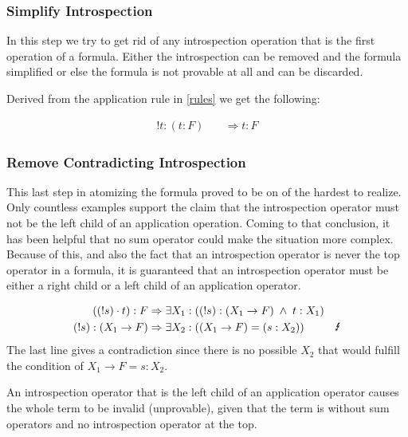 

\subsubsection{Simplify Introspection}
In this step we try to get rid of any introspection operation that is the first operation of a formula. Either the introspection can be removed and the formula simplified or else the formula is not provable at all and can be discarded.

Derived from the application rule in \ref{rules} we get the following:

\begin{align}\label{sb}
	!t:(t:F) \quad & \Rightarrow t: F
\end{align}



\subsubsection{Remove Contradicting Introspection}
This last step in atomizing the formula proved to be on of the hardest to realize. Only countless examples support the claim that the introspection operator must not be the left child of an application operation. Coming to that conclusion, it has been helpful that no sum operator could make the situation more complex. Because of this, and also the fact that an introspection operator is never the top operator in a formula, it is guaranteed that an introspection operator must be either a right child or a left child of an application operator.

\begin{align}\label{bb}
	((!s)\cdot t):F  & \Rightarrow \exists X_1 : ((!s): (X_1 \rightarrow F) \; \land \; t: X_1)\\
	(!s): (X_1 \rightarrow F)  &\Rightarrow \exists X_2 : ((X_1 \rightarrow F) = (s:X_2)) & \text{\Lightning}
\end{align}
The last line gives a contradiction since there is no possible $X_2$ that would fulfill the condition of $X_1 \rightarrow F = s:X_2$.

\begin{assertion}
An introspection operator that is the left child of an application operator causes the whole term to be invalid (unprovable), given that the term is without sum operators and no introspection operator at the top.
\end{assertion}

